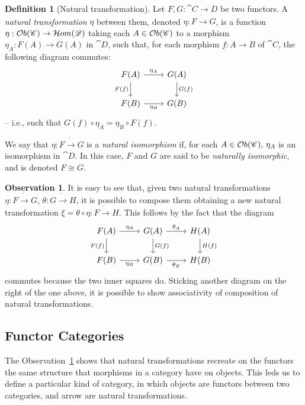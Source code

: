 \documentclass[a4paper, twoside,openright]{report}
\theoremstyle{plain}
\theoremstyle{definition}
\newtheorem{definition}[theorem]{Definition}
\newtheorem{obs}[theorem]{Observation}
\begin{document}
\begin{definition}[Natural transformation]
    Let $F,G : \cat {C \rightarrow D}$ be two functors. A \emph{natural transformation} $\eta$ between them, denoted $\eta: F \dot\rightarrow G$, is a function $\eta: \mathcal{O}b(\mathscr{C}) \rightarrow \mathcal{H}om(\mathscr{D})$ taking each $A \in \mathcal{O}b(\mathscr{C})$ to a morphism $\eta_A:F(A) \rightarrow G(A)$ in $\cat{D}$, such that, for each morphism $f: A \rightarrow B$ of $\cat C$, the following diagram commutes:
    \[
        \begin{tikzcd}
            F(A) \arrow[d, "F(f)" swap] \arrow[r, "{\eta_A}"] & G(A) \arrow[d, "G(f)"] \\
            F(B) \arrow[r, "{\eta_B}"swap] & G(B)
        \end{tikzcd}
    \]
    -- i.e., such that $G(f) \circ \eta_A = \eta_B \circ F(f)$.

    We say that $\eta: F \dot\rightarrow G$ is a \emph{natural isomorphism} if, for each $A \in \mathcal{O}b(\mathscr{C}) \text{, } \eta_A$ is an isomorphism in $\cat D$. In this case, $F$ and $G$ are said to be \emph{naturally isomorphic}, and is denoted $F \cong G$.    
\end{definition}

\begin{obs}\label{obs:comp_assoc_nat_tran}
It is easy to see that, given two natural transformations $\eta:F\dot\rightarrow G$, $\theta: G \dot\rightarrow H$, it is possible to compose them obtaining a new natural transformation $\xi = \theta \circ \eta : F \dot \rightarrow H$. This follows by the fact that the diagram
\[
        \begin{tikzcd}
            F(A) \arrow[d, "F(f)" swap] \arrow[r, "{\eta_A}"] 
                & G(A) \arrow[d, "G(f)"] \arrow[r, "{\theta_A}"]
                & H(A) \arrow[d, "H(f)"] \\
            F(B) \arrow[r, "{\eta_B}"swap]
                & G(B) \arrow[r, "{\theta_B}" swap]
                & H(B)
        \end{tikzcd}
\]
commutes because the two inner squares do. Sticking another diagram on the right of the one above, it is possible to show associativity of composition of natural transformations.
\end{obs}

\subsection{Functor Categories}

The Observation~\ref{obs:comp_assoc_nat_tran} shows that natural transformations recreate on the functors the same structure that morphisms in a category have on objects. This leds us to define a particular kind of category, in which objects are functors between two categories, and arrow are natural transformations.
\end{document}
